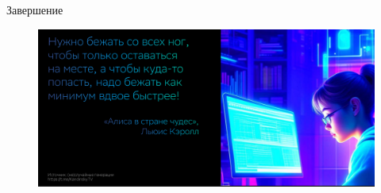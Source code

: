 \documentclass[12pt, pdf, hyperref={unicode},handout]{beamer}
\begin{document}
\begin{frame}{\Large{Завершение}}

  \begin{figure}[htb] 
      \centering
      \includegraphics [scale=0.9]{fin.png}
    \end{figure}


\end{frame}
\end{document}
